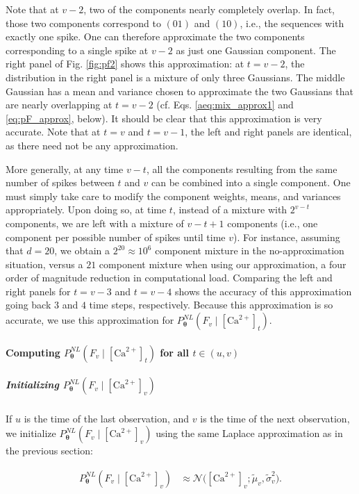 \documentclass[10pt]{article}
\providecommand{\ve}[1]{\boldsymbol{#1}}
\providecommand{\ve}[1]{\boldsymbol{#1}}
\newcommand{\thetn}{\ve{\theta}}
\newcommand{\p}{P_{\thetn}}
\newcommand{\Ca}{[\text{Ca}^{2+}]}
\begin{document}
Note that at $v-2$, two of the components nearly completely overlap.  In fact, those two components correspond to $(01)$ and $(10)$, i.e., the sequences with exactly one spike.   One can therefore approximate the two components corresponding to a single spike at $v-2$ as just one Gaussian component. The right panel of Fig. \ref{fig:pf2} shows this approximation: at $t=v-2$, the distribution in the right panel is a mixture of only three Gaussians.  The middle Gaussian has a mean and variance chosen to approximate the two Gaussians that are nearly overlapping at $t=v-2$ (cf. Eqs. \ref{aeq:mix_approx1} and \ref{eq:pF_approx}, below).  It should be clear that this approximation is very accurate.  Note that at $t=v$ and $t=v-1$, the left and right panels are identical, as there need not be any approximation.

More generally, at any time $v-t$, all the components resulting from the same number of spikes between $t$ and $v$ can be combined into a single component.  One must simply take care to modify the component weights, means, and variances appropriately.  Upon doing so, at time $t$, instead of a mixture with $2^{v-t}$ components, we are left with a mixture of $v-t+1$ components (i.e., one component per possible number of spikes until time $v$). For instance, assuming that $d=20$, we obtain a $2^{20} \approx 10^6$ component mixture in the no-approximation situation, versus a $21$ component mixture when using our approximation, a four order of magnitude reduction in computational load. Comparing the left and right panels for $t=v-3$ and $t=v-4$ shows the accuracy of this approximation going back $3$ and $4$ time steps, respectively. Because this approximation is so accurate, we use this approximation for $\p^{NL}(F_v \mid \Ca_t)$.

\paragraph{Computing $\p^{NL}(F_v \mid \Ca_t)$ for all $t \in (u,v)$}

\subparagraph{Initializing $\p^{NL}(F_v \mid \Ca_v)$}

If $u$ is the time of the last observation, and $v$ is the time of the next observation, we initialize $\p^{NL}(F_v \mid \Ca_v)$ using the same Laplace approximation as in the previous section:

\begin{align} \label{eq:obs_lik}
\p^{NL}(F_v \mid \Ca_v) &\approx \mathcal{N}\big(\Ca_v; \widetilde{\mu}_v, \widetilde{\sigma}_v^2\big).
\end{align}
\end{document}
